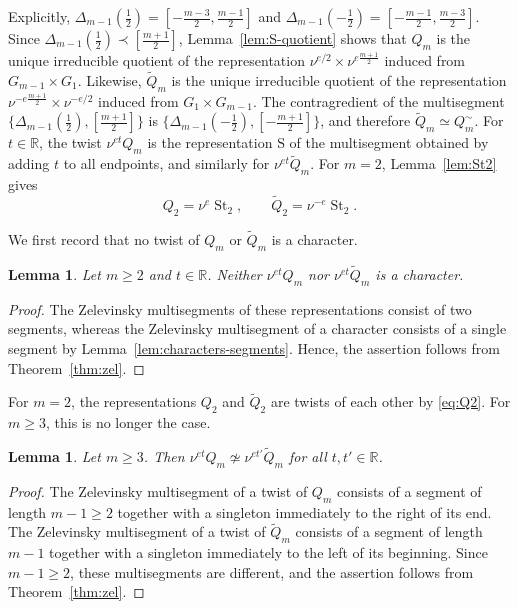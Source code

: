 \documentclass[11pt]{amsart}
\numberwithin{equation}{section}
\theoremstyle{plain}
\newtheorem{lemma}[theorem]{Lemma}
\theoremstyle{definition}
\theoremstyle{remark}
\newcommand{\R}{\mathbb{R}}
\DeclareMathOperator{\St}{St}
\newcommand{\Qt}{\widetilde{Q}}
\newcommand{\Ss}{\mathrm{S}}
\begin{document}
Explicitly, $\Delta_{m-1}(\frac12)=[-\frac{m-3}2,\frac{m-1}2]$ and $\Delta_{m-1}(-\frac12)=[-\frac{m-1}2,\frac{m-3}2]$. Since $\Delta_{m-1}(\frac12)\prec[\frac{m+1}2]$, Lemma~\ref{lem:S-quotient} shows that $Q_m$ is the unique irreducible quotient of the representation $\nu^{e/2}\times\nu^{e\frac{m+1}2}$ induced from $G_{m-1}\times G_1$. Likewise, $\Qt_m$ is the unique irreducible quotient of the representation $\nu^{-e\frac{m+1}2}\times\nu^{-e/2}$ induced from $G_1\times G_{m-1}$. The contragredient of the multisegment $\{\Delta_{m-1}(\frac12),[\frac{m+1}2]\}$ is $\{\Delta_{m-1}(-\frac12),[-\frac{m+1}2]\}$, and therefore $\Qt_m\simeq Q_m^\sim$. For $t\in\R$, the twist $\nu^{et}Q_m$ is the representation $\Ss$ of the multisegment obtained by adding $t$ to all endpoints, and similarly for $\nu^{et}\Qt_m$. For $m=2$, Lemma~\ref{lem:St2} gives
\begin{equation}\label{eq:Q2}
	Q_2=\nu^e\St_2,\qquad \Qt_2=\nu^{-e}\St_2 .
\end{equation}

We first record that no twist of $Q_m$ or $\Qt_m$ is a character.

\begin{lemma}\label{lem:Qm-not-char}
	Let $m\ge2$ and $t\in\R$. Neither $\nu^{et}Q_m$ nor $\nu^{et}\Qt_m$ is a character.
\end{lemma}

\begin{proof}
	The Zelevinsky multisegments of these representations consist of two segments, whereas the Zelevinsky multisegment of a character consists of a single segment by Lemma~\ref{lem:characters-segments}. Hence, the assertion follows from Theorem~\ref{thm:zel}.
\end{proof}

For $m=2$, the representations $Q_2$ and $\Qt_2$ are twists of each other by \eqref{eq:Q2}. For $m\ge3$, this is no longer the case.

\begin{lemma}\label{lem:Q-vs-Qt}
	Let $m\ge3$. Then $\nu^{et}Q_m\not\simeq\nu^{et'}\Qt_m$ for all $t,t'\in\R$.
\end{lemma}

\begin{proof}
	The Zelevinsky multisegment of a twist of $Q_m$ consists of a segment of length $m-1\ge2$ together with a singleton immediately to the right of its end. The Zelevinsky multisegment of a twist of $\Qt_m$ consists of a segment of length $m-1$ together with a singleton immediately to the left of its beginning. Since $m-1\ge2$, these multisegments are different, and the assertion follows from Theorem~\ref{thm:zel}.
\end{proof}
\end{document}
